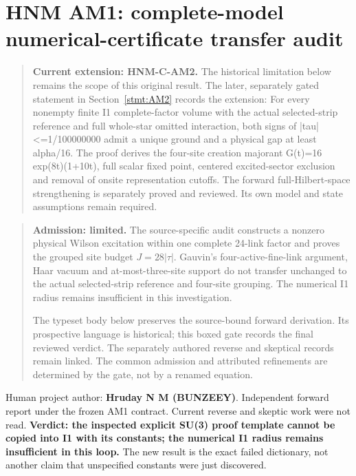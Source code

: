 \hypertarget{r29-am1-am1-forward-hnm-complete-model-numerical-certificate-transfer-audit}{%
\section{HNM AM1: complete-model numerical-certificate transfer audit\workstar}\label{r29:am1:r29-am1-am1-forward-hnm-complete-model-numerical-certificate-transfer-audit}}
\begin{quote}\small\textbf{Current extension: HNM-C-AM2.} The historical limitation below remains the scope of this original result. The later, separately gated statement in Section~\ref{stmt:AM2} records the extension: For every nonempty finite I1 complete-factor volume with the actual selected-strip reference and full whole-star omitted interaction, both signs of |tau|<=1/100000000 admit a unique ground and a physical gap at least alpha/16. The proof derives the four-site creation majorant G(t)=16 exp(8t)(1+10t), full scalar fixed point, centered excited-sector exclusion and removal of onsite representation cutoffs. The forward full-Hilbert-space strengthening is separately proved and reviewed. Its own model and state assumptions remain required.\end{quote}

\begin{quote}\small \textbf{Admission: limited.} The source-specific audit constructs a nonzero physical Wilson excitation within one complete 24-link factor and proves the grouped site budget \(J=28|\tau|\). Gauvin's four-active-fine-link argument, Haar vacuum and at-most-three-site support do not transfer unchanged to the actual selected-strip reference and four-site grouping. The numerical I1 radius remains insufficient in this investigation.\par The typeset body below preserves the source-bound forward derivation. Its prospective language is historical; this boxed gate records the final reviewed verdict. The separately authored reverse and skeptical records remain linked. The common admission and attributed refinements are determined by the gate, not by a renamed equation.\end{quote}
Human project author: \textbf{Hruday N M (BUNZEEY)}. Independent forward report under the frozen AM1 contract. Current reverse and skeptic work were not read. \textbf{Verdict: the inspected explicit SU(3) proof template cannot be copied into I1 with its constants; the numerical I1 radius remains insufficient in this loop.} The new result is the exact failed dictionary, not another claim that unspecified constants were just discovered.

